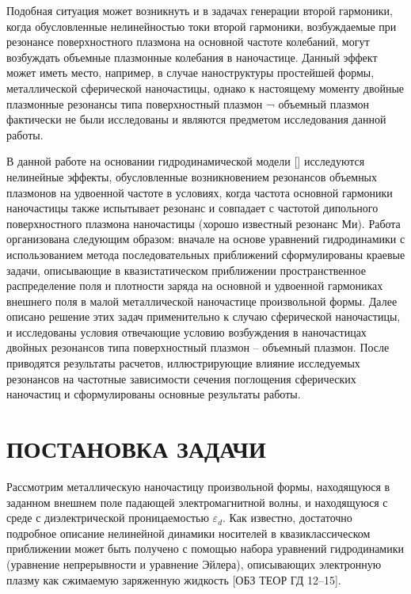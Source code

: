 \documentclass[12pt, a4paper]{article}
\def \eps {\varepsilon}
\begin{document}
Подобная ситуация может возникнуть и в задачах генерации второй гармоники, когда обусловленные нелинейностью токи второй гармоники, возбуждаемые при резонансе поверхностного плазмона на основной частоте колебаний, могут возбуждать объемные плазмонные колебания в наночастице. Данный эффект может иметь место, например, в случае наноструктуры простейшей формы, металлической сферической наночастицы, однако к настоящему моменту двойные плазмонные резонансы типа поверхностный плазмон ¬ объемный плазмон фактически не были исследованы и являются предметом исследования данной работы.

В данной работе на основании гидродинамической модели [] исследуются нелинейные эффекты, обусловленные возникновением резонансов объемных плазмонов на удвоенной частоте в условиях, когда частота основной гармоники наночастицы также испытывает резонанс и совпадает с частотой дипольного поверхностного плазмона наночастицы (хорошо известный резонанс Ми). Работа организована следующим образом: вначале на основе уравнений гидродинамики с использованием метода последовательных приближений сформулированы краевые задачи, описывающие в квазистатическом приближении пространственное распределение поля и плотности заряда на основной и удвоенной гармониках внешнего поля в малой металлической наночастице произвольной формы. Далее описано решение этих задач применительно к случаю сферической наночастицы, и исследованы условия отвечающие условию возбуждения в наночастицах двойных резонансов типа поверхностный плазмон – объемный плазмон. После приводятся результаты расчетов, иллюстрирующие влияние исследуемых резонансов на частотные зависимости сечения поглощения сферических наночастиц и сформулированы основные результаты работы.


\section{ПОСТАНОВКА ЗАДАЧИ}

Рассмотрим металлическую наночастицу произвольной формы, находящуюся в заданном внешнем поле падающей электромагнитной волны, и находящуюся с среде с диэлектрической проницаемостью $\eps_d$. Как известно, достаточно подробное описание нелинейной динамики носителей в квазиклассическом приближении может быть получено с помощью набора уравнений гидродинамики (уравнение непрерывности и уравнение Эйлера), описывающих электронную плазму как сжимаемую заряженную жидкость [ОБЗ ТЕОР ГД  12–15]. 
\end{document}
